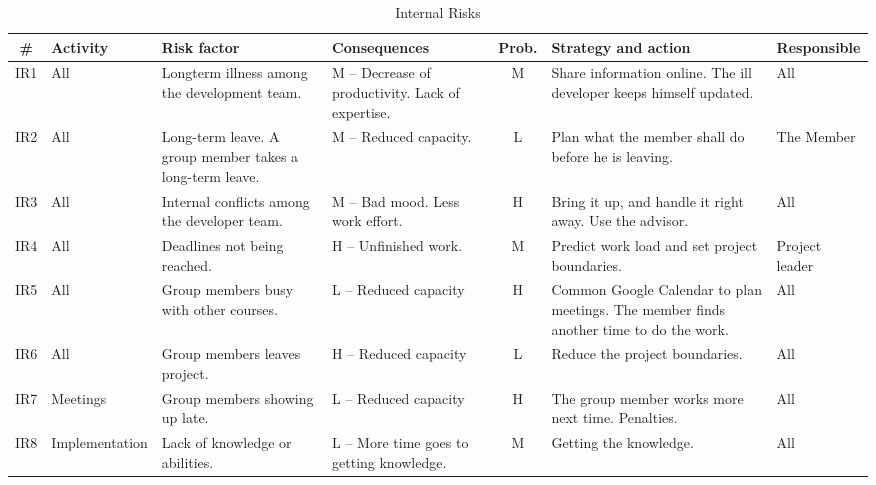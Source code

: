 \begin{table}
	\centering
		\begin{sideways}
			\begin{tabular}{|  c 	 |	l 	| 	p{4.0cm} 	 |	p{4.0cm} 	  |	c 	 |	p{4.0cm} 	| 	l| }
			\hline
			  \# & Activity 	& Risk factor 	& Consequences 	& Prob.& Strategy and action 							& Responsible \\
			\hline
			  IR1 & All		& Longterm illness among the development team.  	& M -- Decrease of productivity. Lack of expertise.	& M 	& Share information online. The ill developer keeps himself updated. 	& All \\
			\hline
			  IR2 & All		& Long-term leave. A group member takes a long-term leave.  & M -- Reduced capacity.  & L	&  Plan what the member shall do before he is leaving.		& The Member \\
			\hline
			  IR3 & All		& Internal conflicts among the developer team.		& M -- Bad mood. Less work effort.  & H	&  Bring it up, and handle it right away. Use the advisor. 		& All \\
			\hline
			  IR4 & All		& Deadlines not being reached.			 	& H -- Unfinished work.  & M	&  Predict work load and set project boundaries. 	& Project leader \\
			\hline
			  IR5 & All		& Group members busy with other courses.		 & L -- Reduced capacity & H	&  Common Google Calendar to plan meetings. The member finds another time to do the work. 	& All \\
			\hline
			  IR6 & All		& Group members leaves project.		 	& H -- Reduced capacity & L	&  Reduce the project boundaries.	& All \\
			\hline
			  IR7 & Meetings		& Group members showing up late.	 	& L -- Reduced capacity & H	&  The group member works more next time. Penalties. 	& All \\
			\hline
			  IR8 & Implementation		& Lack of knowledge or abilities.	 	& L -- More time goes to getting knowledge. & M & Getting the knowledge. 	& All \\
			  \hline
			\end{tabular}
		\end{sideways}
	\caption{Internal Risks}
	\label{tab:internalRisks}
\end{table}

